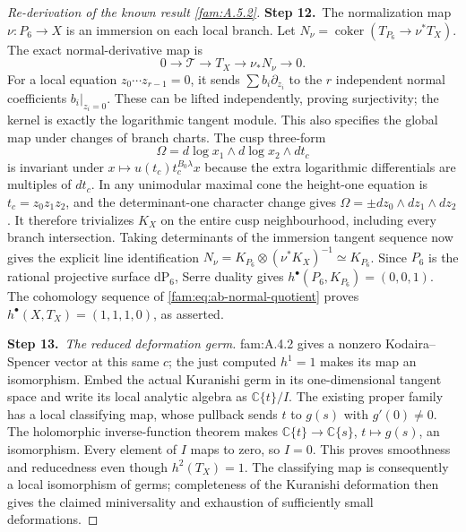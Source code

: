 \begin{proof}[Re-derivation of the known result \ref{fam:A.5.2}]
\par\smallskip\noindent\textbf{Step 12.}\ The normalization map $\nu:P_6\to X$ is an immersion on each local
branch. Let $N_\nu=\operatorname{coker}(T_{P_6}\to\nu^*T_X)$.
The exact normal-derivative map is
\begin{equation}\label{fam:eq:ab-normal-quotient}
 0\longrightarrow\mathcal T\longrightarrow T_X
 \longrightarrow\nu_*N_\nu\longrightarrow0.
\end{equation}
For a local equation $z_0\cdots z_{r-1}=0$, it sends
$\sum b_i\partial_{z_i}$ to the $r$ independent normal coefficients
$b_i|_{z_i=0}$. These can be lifted independently, proving
surjectivity; the kernel is exactly the logarithmic tangent module.
This also specifies the global map under changes of branch charts.
The cusp three-form
\[
 \Omega=d\log x_1\wedge d\log x_2\wedge dt_c
\]
is invariant under $x\mapsto u(t_c)t_c^{B_0\lambda}x$ because the
extra logarithmic differentials are multiples of $dt_c$. In any
unimodular maximal cone the height-one equation is $t_c=z_0z_1z_2$,
and the determinant-one character change gives
$\Omega=\pm dz_0\wedge dz_1\wedge dz_2$.
It therefore trivializes $K_X$ on the entire cusp neighbourhood,
including every branch intersection. Taking determinants of the
immersion tangent sequence now gives the explicit line identification
$N_\nu=K_{P_6}\otimes(\nu^*K_X)^{-1}\simeq K_{P_6}$.
Since $P_6$ is the rational projective surface $\mathrm{dP}_6$,
Serre duality gives $h^\bullet(P_6,K_{P_6})=(0,0,1)$.
The cohomology sequence of \eqref{fam:eq:ab-normal-quotient} proves
$h^\bullet(X,T_X)=(1,1,1,0)$, as asserted.

\par\smallskip\noindent\textbf{Step 13.}\ \emph{The reduced deformation germ.}
fam:A.4.2 gives a nonzero Kodaira--Spencer vector at this same $c$;
the just computed $h^1=1$ makes its map an isomorphism.
Embed the actual Kuranishi germ in its one-dimensional tangent space
and write its local analytic algebra as $\mathbb C\{t\}/I$.
The existing proper family has a local classifying map, whose pullback
sends $t$ to $g(s)$ with $g'(0)\ne0$. The holomorphic inverse-function
theorem makes $\mathbb C\{t\}\to\mathbb C\{s\}$, $t\mapsto g(s)$,
an isomorphism. Every element of $I$ maps to zero, so $I=0$.
This proves smoothness and reducedness even though $h^2(T_X)=1$.
The classifying map is consequently a local isomorphism of germs;
completeness of the Kuranishi deformation then gives the claimed
miniversality and exhaustion of sufficiently small deformations.
\end{proof}
